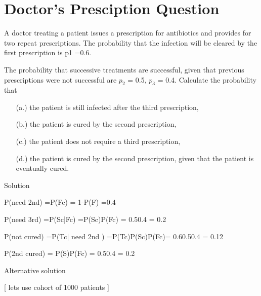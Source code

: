 	
\section{Doctor's Presciption Question}


A doctor treating a patient issues a prescription for antibiotics and provides for two repeat prescriptions. The probability that the infection will be cleared by the first prescription is p1 =0.6. 


The probability that successive treatments are successful, given that previous prescriptions were not successful are $p_2$ = 0.5, $p_3$ = 0.4. Calculate the probability that  

\begin{itemize}   
	\item[(a.)] the patient is still infected after the third prescription,
	\item[(b.)] the patient is cured by the second prescription,
	\item[(c.)] the patient does not require a third prescription,
	\item[(d.)] the patient is cured by the second prescription, given that the patient is eventually cured.
\end{itemize}





Solution


P(need 2nd) =P(Fc) = 1-P(F) =0.4


P(need 3rd) =P(Sc|Fc) =P(Sc)P(Fc) = 0.50.4 = 0.2


P(not cured) =P(Tc| need 2nd ) =P(Tc)P(Sc)P(Fc)= 0.60.50.4 = 0.12


P(2nd cured) = P(S)P(Fc) = 0.50.4 = 0.2




Alternative solution

[ lets use cohort of 1000 patients ]


